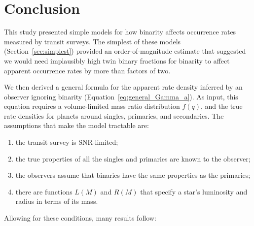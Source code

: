 \documentclass[12pt,modern]{aastex61}
\begin{document}

\section{Conclusion}
\label{sec:conclusion}

This study presented simple models for how binarity affects occurrence
rates measured by transit surveys.  The simplest of these models
(Section~\ref{sec:simplest}) provided an order-of-magnitude estimate
that suggested we would need implausibly high twin binary fractions
for binarity to affect apparent occurrence rates by more than factors
of two.

We then derived a general formula for the apparent rate density
inferred by an observer ignoring binarity
(Equation~\ref{eq:general_Gamma_a}).  As input, this equation requires
a volume-limited mass ratio distribution $f(q)$, and the true rate
densities for planets around singles, primaries, and secondaries.  The
assumptions that make the model tractable are:
\begin{enumerate}
    \item the transit survey is SNR-limited;
    \item the true properties of all the singles and primaries are
      known to the observer;
    \item the observers assume that binaries have the same properties
      as the primaries;
    \item there are functions $L(M)$ and $R(M)$ that specify a star's
      luminosity and radius in terms of its mass.
\end{enumerate}
Allowing for these conditions, many results follow:
\end{document}
